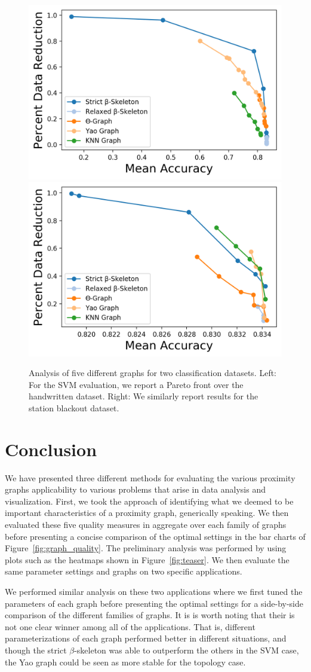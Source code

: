 \begin{figure}[htbp]
    \centering
    \includegraphics[width=0.48\linewidth]{figs/chap7/pareto_letters.png}
    \includegraphics[width=0.48\linewidth]{figs/chap7/pareto_sbo.png}
    \caption{Analysis of five different graphs for two classification datasets.
    Left: For the SVM evaluation, we report a Pareto front over the handwritten dataset.
    Right: We similarly report results for the station blackout dataset.}
    \label{fig:graph_svm}
\end{figure}

\section{Conclusion}
We have presented three different methods for evaluating the various proximity graphs applicability to various problems that arise in data analysis and visualization.
%
First, we took the approach of identifying what we deemed to be important characteristics of a proximity graph, generically speaking.
%
We then evaluated these five quality measures in aggregate over each family of graphs before presenting a concise comparison of the optimal settings in the bar charts of Figure~\ref{fig:graph_quality}.
%
The preliminary analysis was performed by using plots such as the heatmaps shown in Figure~\ref{fig:teaser}.
%
We then evaluate the same parameter settings and graphs on two specific applications.

We performed similar analysis on these two applications where we first tuned the parameters of each graph before presenting the optimal settings for a side-by-side comparison of the different families of graphs.
%
It is is worth noting that their is not one clear winner among all of the applications.
%
That is, different parameterizations of each graph performed better in different situations, and though the strict $\beta$-skeleton was able to outperform the others in the SVM case, the Yao graph could be seen as more stable for the topology case.

